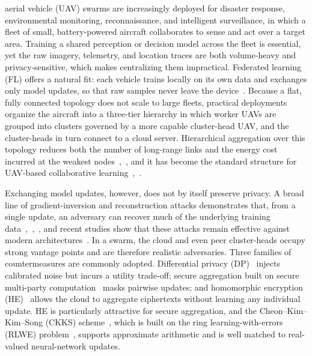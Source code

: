  aerial vehicle (UAV) swarms are increasingly deployed for disaster response, environmental monitoring, reconnaissance, and intelligent surveillance, in which a fleet of small, battery-powered aircraft collaborates to sense and act over a target area. Training a shared perception or decision model across the fleet is essential, yet the raw imagery, telemetry, and location traces are both volume-heavy and privacy-sensitive, which makes centralizing them impractical. Federated learning (FL) offers a natural fit: each vehicle trains locally on its own data and exchanges only model updates, so that raw samples never leave the device~\cite{bonawitz2019towards}. Because a flat, fully connected topology does not scale to large fleets, practical deployments organize the aircraft into a three-tier hierarchy in which worker UAVs are grouped into clusters governed by a more capable cluster-head UAV, and the cluster-heads in turn connect to a cloud server. Hierarchical aggregation over this topology reduces both the number of long-range links and the energy cost incurred at the weakest nodes~\cite{liu2020hierfavg},~\cite{wang2021rflha}, and it has become the standard structure for UAV-based collaborative learning~\cite{ahmed2025uav},~\cite{nagarajan2025drone}.

Exchanging model updates, however, does not by itself preserve privacy. A broad line of gradient-inversion and reconstruction attacks demonstrates that, from a single update, an adversary can recover much of the underlying training data~\cite{zhu2019deep},~\cite{geiping2020inverting},~\cite{zhao2020idlg}, and recent studies show that these attacks remain effective against modern architectures~\cite{guo2025exploring}. In a swarm, the cloud and even peer cluster-heads occupy strong vantage points and are therefore realistic adversaries. Three families of countermeasures are commonly adopted. Differential privacy (DP)~\cite{mcmahan2017learning} injects calibrated noise but incurs a utility trade-off; secure aggregation built on secure multi-party computation~\cite{bonawitz2017practical} masks pairwise updates; and homomorphic encryption (HE)~\cite{gentry2009fully} allows the cloud to aggregate ciphertexts without learning any individual update. HE is particularly attractive for secure aggregation, and the Cheon--Kim--Kim--Song (CKKS) scheme~\cite{cheon2017ckks}, which is built on the ring learning-with-errors (RLWE) problem~\cite{lyubashevsky2010ideal}, supports approximate arithmetic and is well matched to real-valued neural-network updates.

